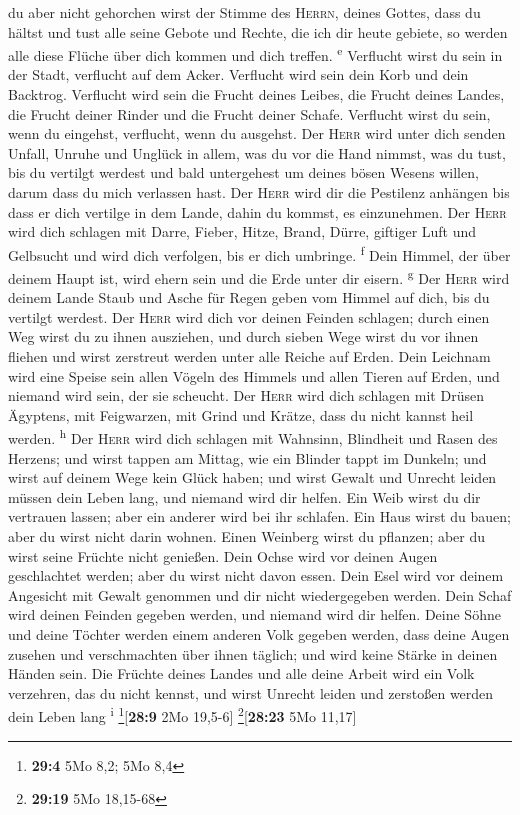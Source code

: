 du aber nicht gehorchen wirst der Stimme des \textsc{Herrn}, deines
Gottes, dass du hältst und tust alle seine Gebote und Rechte, die ich
dir heute gebiete, so werden alle diese Flüche über dich kommen und dich
treffen. \textsuperscript{e}  Verflucht wirst du sein in
der Stadt, verflucht auf dem Acker.  Verflucht wird sein
dein Korb und dein Backtrog.  Verflucht wird sein die
Frucht deines Leibes, die Frucht deines Landes, die Frucht deiner Rinder
und die Frucht deiner Schafe.  Verflucht wirst du sein,
wenn du eingehst, verflucht, wenn du ausgehst.  Der
\textsc{Herr} wird unter dich senden Unfall, Unruhe und Unglück in
allem, was du vor die Hand nimmst, was du tust, bis du vertilgt werdest
und bald untergehest um deines bösen Wesens willen, darum dass du mich
verlassen hast.  Der \textsc{Herr} wird dir die Pestilenz
anhängen bis dass er dich vertilge in dem Lande, dahin du kommst, es
einzunehmen.  Der \textsc{Herr} wird dich schlagen mit
Darre, Fieber, Hitze, Brand, Dürre, giftiger Luft und Gelbsucht und wird
dich verfolgen, bis er dich umbringe. \textsuperscript{f}
 Dein Himmel, der über deinem Haupt ist, wird ehern sein
und die Erde unter dir eisern. \textsuperscript{g}  Der
\textsc{Herr} wird deinem Lande Staub und Asche für Regen geben vom
Himmel auf dich, bis du vertilgt werdest.  Der
\textsc{Herr} wird dich vor deinen Feinden schlagen; durch einen Weg
wirst du zu ihnen ausziehen, und durch sieben Wege wirst du vor ihnen
fliehen und wirst zerstreut werden unter alle Reiche auf Erden.
 Dein Leichnam wird eine Speise sein allen Vögeln des
Himmels und allen Tieren auf Erden, und niemand wird sein, der sie
scheucht.  Der \textsc{Herr} wird dich schlagen mit
Drüsen Ägyptens, mit Feigwarzen, mit Grind und Krätze, dass du nicht
kannst heil werden. \textsuperscript{h}  Der
\textsc{Herr} wird dich schlagen mit Wahnsinn, Blindheit und Rasen des
Herzens;  und wirst tappen am Mittag, wie ein Blinder
tappt im Dunkeln; und wirst auf deinem Wege kein Glück haben; und wirst
Gewalt und Unrecht leiden müssen dein Leben lang, und niemand wird dir
helfen.  Ein Weib wirst du dir vertrauen lassen; aber ein
anderer wird bei ihr schlafen. Ein Haus wirst du bauen; aber du wirst
nicht darin wohnen. Einen Weinberg wirst du pflanzen; aber du wirst
seine Früchte nicht genießen.  Dein Ochse wird vor deinen
Augen geschlachtet werden; aber du wirst nicht davon essen. Dein Esel
wird vor deinem Angesicht mit Gewalt genommen und dir nicht
wiedergegeben werden. Dein Schaf wird deinen Feinden gegeben werden, und
niemand wird dir helfen.  Deine Söhne und deine Töchter
werden einem anderen Volk gegeben werden, dass deine Augen zusehen und
verschmachten über ihnen täglich; und wird keine Stärke in deinen Händen
sein.  Die Früchte deines Landes und alle deine Arbeit
wird ein Volk verzehren, das du nicht kennst, und wirst Unrecht leiden
und zerstoßen werden dein Leben lang \textsuperscript{i}
\footnote{\textbf{29:4} 5Mo 8,2; 5Mo 8,4}{[}\textbf{28:9} 2Mo 19,5-6{]}
\footnote{\textbf{29:19} 5Mo 18,15-68}{[}\textbf{28:23} 5Mo 11,17{]}

